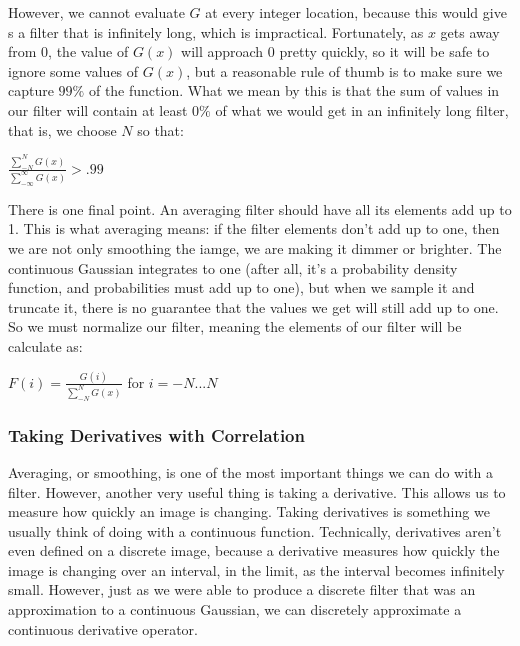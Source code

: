 \documentclass{report}
\begin{document}
However, we cannot evaluate $G$ at every integer location, because this would give s a filter that is infinitely long, which is impractical. Fortunately, as $x$ gets away from 0, the value of $G(x)$ will approach 0 pretty quickly, so it will be safe to ignore some values of $G(x)$, but a reasonable rule of thumb is to make sure we capture $99\%$ of the function. What we mean by this is that the sum of values in our filter will contain at least $0\%$ of what we would get in an infinitely long filter, that is, we choose $N$ so that:\newline\newline
    \centerline{$\frac{\sum_{-N}^{N}G(x)}{\sum_{-\infty}^{\infty}G(x)} > .99$}\newline\newline
There is one final point. An averaging filter should have all its elements add up to 1. This is what averaging means: if the filter elements don't add up to one, then we are not only smoothing the iamge, we are making it dimmer or brighter. The continuous Gaussian integrates to one (after all, it's a probability density function, and probabilities must add up to one), but when we sample it and truncate it, there is no guarantee that the values we get will still add up to one. So we must normalize our filter, meaning the elements of our filter will be calculate as:\newline\newline
    \centerline{$F(i) = \frac{G(i)}{\sum_{-N}^{N}G(x)}$ for $i=-N...N$}\newline

\subsubsection{Taking Derivatives with Correlation}
Averaging, or smoothing, is one of the most important things we can do with a filter. However, another very useful thing is taking a derivative. This allows us to measure how quickly an image is changing. Taking derivatives is something we usually think of doing with a continuous function. Technically, derivatives aren't even defined on a discrete image, because a derivative measures how quickly the image is changing over an interval, in the limit, as the interval becomes infinitely small. However, just as we were able to produce a discrete filter that was an approximation to a continuous Gaussian, we can discretely approximate a continuous derivative operator.\newline
\end{document}

